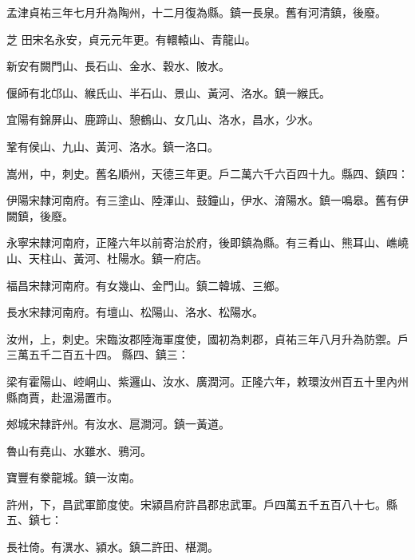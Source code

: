 \begin{pinyinscope}
 孟津貞祐三年七月升為陶州，十二月復為縣。鎮一長泉。舊有河清鎮，後廢。



 芝
 田宋名永安，貞元元年更。有轘轅山、青龍山。



 新安有闕門山、長石山、金水、穀水、陂水。



 偃師有北邙山、緱氏山、半石山、景山、黃河、洛水。鎮一緱氏。



 宜陽有錦屏山、鹿蹄山、憩鶴山、女几山、洛水，昌水，少水。



 鞏有侯山、九山、黃河、洛水。鎮一洛口。



 嵩州，中，刺史。舊名順州，天德三年更。戶二萬六千六百四十九。縣四、鎮四：



 伊陽宋隸河南府。有三塗山、陸渾山、鼓鐘山，伊水、淯陽水。鎮一鳴皋。舊有伊闕鎮，後廢。



 永寧宋隸河南府，正隆六年以前寄治於府，後即鎮為縣。有三肴山、熊耳山、嶕嶢山、天柱山、黃河、杜陽水。鎮一府店。



 福昌宋隸河南府。有女幾山、金門山。鎮二韓城、三鄉。



 長水宋隸河南府。有壇山、松陽山、洛水、松陽水。



 汝州，上，刺史。宋臨汝郡陸海軍度使，國初為刺郡，貞祐三年八月升為防禦。戶三萬五千二百五十四。
 縣四、鎮三：



 梁有霍陽山、崆峒山、紫邏山、汝水、廣潤河。正隆六年，敕環汝州百五十里內州縣商賈，赴溫湯置市。



 郟城宋隸許州。有汝水、扈澗河。鎮一黃道。



 魯山有堯山、水雖水、鴉河。



 寶豐有豢龍城。鎮一汝南。



 許州，下，昌武軍節度使。宋潁昌府許昌郡忠武軍。戶四萬五千五百八十七。縣五、鎮七：



 長社倚。有潩水、潁水。鎮二許田、椹澗。




\end{pinyinscope}
